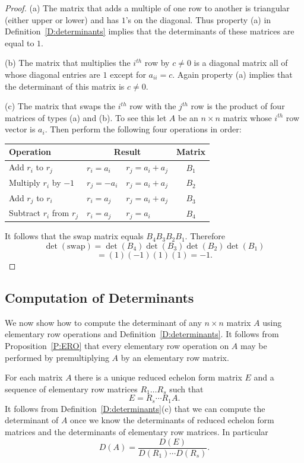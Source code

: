 \documentclass{ximera}
\begin{document}
\begin{proof} 
(a) The matrix that adds a multiple of one row to another is
triangular (either upper or lower) and has $1$'s on the
diagonal.  Thus property (a) in Definition~\ref{D:determinants}
implies that the determinants of these matrices are equal to $1$.
 
(b) The matrix that multiplies the $i^{th}$ row by $c\neq 0$ is a 
diagonal matrix all of whose diagonal entries are $1$
except for $a_{ii}=c$.  Again property (a) implies that the
determinant of this matrix is $c\neq 0$. 

(c) The matrix that swaps the $i^{th}$ row with the $j^{th}$ row is 
the product of four matrices of types (a) and (b).  To see this 
let $A$ be an $n\times n$ matrix whose $i^{th}$ row vector is 
$a_i$.  Then perform the following four operations in order:

\begin{center}
\begin{tabular}{lllc}
Operation & \multicolumn{2}{c}{Result} & Matrix\\
\hline
Add $r_i$ to $r_j$ & $r_i = a_i$ & $r_j = a_i + a_j$ & $B_1$ \\
Multiply $r_i$ by $-1$  & $r_j = -a_i$ & $r_j = a_i + a_j$ & $B_2$\\
Add $r_j$ to $r_i$  &  $r_i =  a_j$ &  $r_j = a_i + a_j$ &  $B_3$ \\
Subtract  $r_i$ from $r_j$ & $r_i = a_j$ &  $r_j = a_i$ & $B_4$\\ 
\end{tabular}
\end{center}
It follows that the swap matrix equals $B_4 B_3 B_2 B_1$.  Therefore 
\[
\det(\mbox{swap})  = \det(B_4) \det(B_3) \det(B_2) \det(B_1)
\]
\[ 
 =  (1)(-1)(1)(1) = -1.
\]
\end{proof}


\subsection*{Computation of Determinants}

We now show how to compute the determinant of any $n\times n$ matrix $A$ 
using elementary row operations and Definition~\ref{D:determinants}.  It 
follows from Proposition~\ref{P:ERO} that every elementary row operation 
on $A$ may be performed by premultiplying $A$ by an elementary row matrix. 

For each matrix $A$ there is a unique 
reduced echelon form matrix
$E$ and a sequence of elementary row matrices $R_1\ldots R_s$
such that 
\begin{equation}  \label{e:rowreduction}
E = R_s\cdots R_1A.
\end{equation}
It follows from Definition~\ref{D:determinants}(c) that we can
compute the determinant of $A$ once we know the determinants of
reduced echelon form matrices and the determinants of elementary
row matrices.  In particular
\begin{equation}  \label{e:detformula}
D(A) = \frac{D(E)}{D(R_1)\cdots D(R_s)}.
\end{equation}
\end{document}
